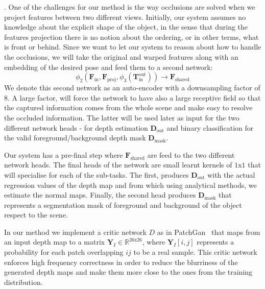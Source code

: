 \vspace{1mm}
. One of the challenges for our method is the way occlusions are solved when we project features between two different views. Initially, our system assumes no knowledge about the explicit shape of the object, in the  sense that during the features projection there is no notion about the ordering,  or in other terms, what is front or behind. Since we want to let our system to reason about how to handle the occlusions, we will take the original and warped features along with an embedding of the desired pose and feed  them to a second network:
\begin{equation}
    \phi_2(\mathbf{F}_{\textrm{in}}, \mathbf{F}_{\textrm{proj}}, \phi_3(\mathbf{T}_{\textrm{in}}^{\textrm{out}})) \rightarrow \mathbf{F}_{\textrm{shared}}
\end{equation}
We denote this second network as an auto-encoder with a downsampling factor of $8$. A large factor, will force the network to have also a large receptive field so that the captured information comes from the whole scene and make easy to resolve the occluded information. The latter will be used later as input for the two different network heads - for depth estimation $\mathbf{D}_{\textrm{out}}$ and binary classification for the valid foreground/background depth mask $\mathbf{D}_{\textrm{mask}}$.

\vspace{1mm}
 Our system has a pre-final step where $\mathbf{F}_{\textrm{shared}}$ are feed to the two different network heads. The final heads of the network are small learnt kernels of $1\textrm{x}1$ that will specialise for each of the sub-tasks. The first, produces $\mathbf{D}_{\textrm{out}}$ with the actual regression values of the depth map and from which using analytical methods, we estimate the normal maps. Finally, the second head produces $\mathbf{D}_{\textrm{mask}}$ that represents a segmentation mask of foreground and background of the object respect to the scene.


\vspace{1mm}
 In our method we implement a critic network $D$ as in PatchGan~\cite{isola2018imagetoimage} that maps from an input depth map to a matrix $\mathbf{Y}_{I} \in \mathbb{R}^{26\text{x}26}$, where $\mathbf{Y}_I[i,j]$ represents a probability for each patch overlapping $ij$ to be a real sample. This critic network enforces high frequency correctness in order to reduce the blurriness of the generated depth maps and make them more close to the ones from the training distribution.

